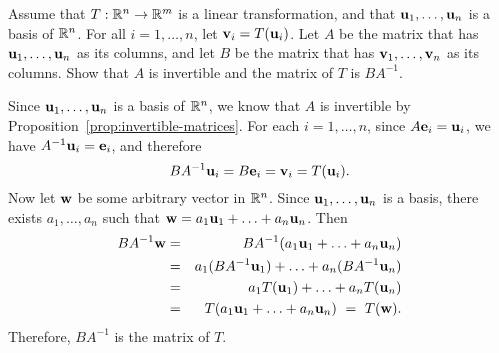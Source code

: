 \begin{ex}\label{ex:linear-transformation-inconvenient}
  Assume that $T:\mathbb{R}^{n}\rightarrow \mathbb{R}^{m}$ is a linear transformation,
  and that $\mbox{\bf u}_1,\ldots,\mbox{\bf u}_n$ is a basis of $\mathbb{R}^n$. For
  all $i=1,\ldots,n$, let $\mbox{\bf v}_i = T(\mbox{\bf u}_i)$. Let $A$ be the
  matrix that has $\mbox{\bf u}_1,\ldots,\mbox{\bf u}_n$ as its columns, and
  let $B$ be the matrix that has $\mbox{\bf v}_1,\ldots,\mbox{\bf v}_n$ as its
  columns. Show that $A$ is invertible and the matrix of $T$ is
  $BA^{-1}$.
  \begin{sol}
    Since $\mbox{\bf u}_1,\ldots,\mbox{\bf u}_n$ is a basis of $\mathbb{R}^n$, we know
    that $A$ is invertible by  Proposition~\ref{prop:invertible-matrices}.
    For each $i=1,\ldots,n$, since $A\mbox{\bf e}_i = \mbox{\bf u}_i$, we have
    $A^{-1}\mbox{\bf u}_i=\mbox{\bf e}_i$, and therefore
    \begin{equation*}
      BA^{-1}\mbox{\bf u}_i = B\mbox{\bf e}_i = \mbox{\bf v}_i = T(\mbox{\bf u}_i).
    \end{equation*}
    Now let $\mbox{\bf w}$ be some arbitrary vector in $\mathbb{R}^n$. Since
    $\mbox{\bf u}_1,\ldots,\mbox{\bf u}_n$ is a basis, there exists
    $a_1,\ldots,a_n$ such that $\mbox{\bf w} =
    a_1\mbox{\bf u}_1+\ldots+a_n\mbox{\bf u}_n$. Then
    \begin{eqnarray*}
      BA^{-1}\mbox{\bf w}
      &=& BA^{-1}(a_1\mbox{\bf u}_1+\ldots+a_n\mbox{\bf u}_n) \\
      &=& a_1(BA^{-1}\mbox{\bf u}_1) + \ldots + a_n(BA^{-1}\mbox{\bf u}_n) \\
      &=& a_1T(\mbox{\bf u}_1) + \ldots + a_nT(\mbox{\bf u}_n) \\
      &=& T(a_1\mbox{\bf u}_1+\ldots+a_n\mbox{\bf u}_n) ~=~ T(\mbox{\bf w}).
    \end{eqnarray*}
    Therefore, $BA^{-1}$ is the matrix of $T$.
  \end{sol}
\end{ex}

